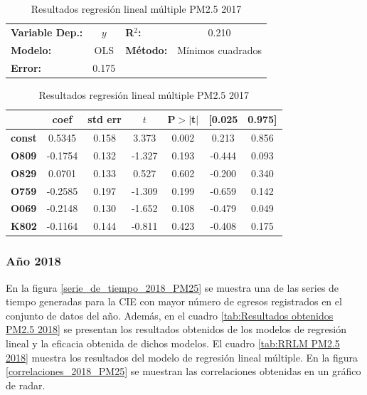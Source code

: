 \begin{table}[hbt!]
\caption{Resultados regresión lineal múltiple PM2.5 2017}
\label{tab:RRLM PM2.5 2017}
\begin{center}
\begin{tabular}{lclc}
\toprule
\textbf{Variable Dep.:}    &        $y$         & \textbf{  R$^2$:         } &     0.210   \\
\textbf{Modelo:}            &       OLS        & \textbf{Método:}           &  Mínimos cuadrados   \\
\textbf{Error:}            & 0.175  \\
\bottomrule
\end{tabular}
\begin{tabular}{lcccccc}
               & \textbf{coef} & \textbf{std err} & \textbf{$t$} & \textbf{P$> |$t$|$} & \textbf{[0.025} & \textbf{0.975]}  \\
\midrule
\textbf{const} &       0.5345  &        0.158     &     3.373  &         0.002        &        0.213    &        0.856     \\
\textbf{O809}  &      -0.1754  &        0.132     &    -1.327  &         0.193        &       -0.444    &        0.093     \\
\textbf{O829}  &       0.0701  &        0.133     &     0.527  &         0.602        &       -0.200    &        0.340     \\
\textbf{O759}  &      -0.2585  &        0.197     &    -1.309  &         0.199        &       -0.659    &        0.142     \\
\textbf{O069}  &      -0.2148  &        0.130     &    -1.652  &         0.108        &       -0.479    &        0.049     \\
\textbf{K802}  &      -0.1164  &        0.144     &    -0.811  &         0.423        &       -0.408    &        0.175     \\
\bottomrule
\end{tabular}
\end{center}
\end{table}

\clearpage
\subsubsection{Año 2018}
En la figura \ref{serie_de_tiempo_2018_PM25} se muestra una de las series de tiempo generadas para la CIE con mayor número de egresos registrados en el conjunto de datos del año. Además, en el cuadro \ref{tab:Resultados obtenidos PM2.5 2018} se presentan los resultados obtenidos de los modelos de regresión lineal y la eficacia obtenida de dichos modelos. El cuadro \ref{tab:RRLM PM2.5 2018} muestra los resultados del modelo de regresión lineal múltiple. En la figura \ref{correlaciones_2018_PM25} se muestran las correlaciones obtenidas en un gráfico de radar.

